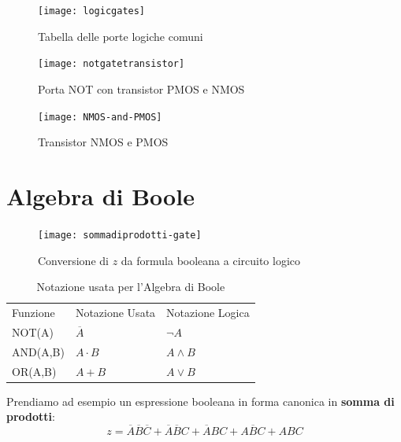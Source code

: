 \begin{figure}
	\centering
	\caption{Tabella delle porte logiche comuni}
	\texttt{[image: logicgates]}
\end{figure}

\begin{figure}
	\centering
	\caption{Porta NOT con transistor PMOS e NMOS}
	\texttt{[image: notgatetransistor]}
\end{figure}

\begin{figure}
	\centering
	\caption{Transistor NMOS e PMOS}
	\texttt{[image: NMOS-and-PMOS]}
\end{figure}

\clearpage

\section{Algebra di Boole}


\begin{figure}[H]
	\centering
	\texttt{[image: sommadiprodotti-gate]}
	\caption{Conversione di $ z $ da formula booleana a circuito logico}
\end{figure}

\begin{table}[H]
	\centering
	\caption{Notazione usata per l'Algebra di Boole}
	\label{tab:notazione-booleana}
	\begin{tabular}{|l|l|l|}
		\hline
		Funzione & Notazione Usata & Notazione Logica \\ 
		NOT(A)   & $\overbar{A}$   & $\lnot A$        \\ 
		AND(A,B) & $A \cdot B$     & $A \land B$      \\ 
		OR(A,B)  & $A + B$         & $A \lor B$       \\ \hline
	\end{tabular}
\end{table}

Prendiamo ad esempio un espressione booleana in forma canonica in \textbf{somma di prodotti}:
\[ z = \overbar{A}\overbar{B}\overbar{C} + \overbar{A}\overbar{B}C + \overbar{A}BC + A\overbar{B}C + ABC \]


